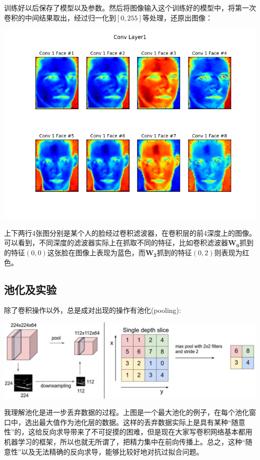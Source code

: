 \documentclass{article}
\begin{document}
训练好以后保存了模型以及参数。然后将图像输入这个训练好的模型中，将第一次卷积的中间结果取出，经过归一化到$[0, 255]$等处理，还原出图像：\\

\begin{center}
\includegraphics[width=0.8\linewidth]{../image/conv1.png}
\end{center}

上下两行4张图分别是某个人的脸经过卷积滤波器，在卷积层的前4深度上的图像。可以看到，不同深度的滤波器实际上在抓取不同的特征，比如卷积滤波器$\mathbf{W_0}$抓到的特征$(0, 0)$这张脸在图像上表现为蓝色，而$\mathbf{W_2}$抓到的特征$(0, 2)$则表现为红色。

\subsection{池化及实验}

除了卷积操作以外，总是成对出现的操作有池化(pooling):

\begin{center}
\includegraphics[width=0.8\linewidth]{./fig14.jpg}
\end{center}

我理解池化是进一步丢弃数据的过程。上图是一个最大池化的例子，在每个池化窗口中，选出最大值作为池化层的数据。这样的丢弃数据实际上是具有某种“随意性”的，这给反向求导带来了不可捉摸的困难，但是现在大家写卷积网络基本都用机器学习的框架，所以也就无所谓了，把精力集中在前向传播上。总之，这种“随意性”以及无法精确的反向求导，能够比较好地对抗过拟合问题。\\
\end{document}
